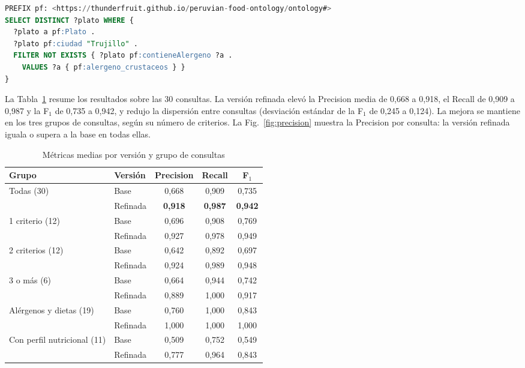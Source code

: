 \documentclass[conference]{IEEEtran}
\begin{document}
\begin{lstlisting}[language=SQL]
PREFIX pf: <https://thunderfruit.github.io/peruvian-food-ontology/ontology#>
SELECT DISTINCT ?plato WHERE {
  ?plato a pf:Plato .
  ?plato pf:ciudad "Trujillo" .
  FILTER NOT EXISTS { ?plato pf:contieneAlergeno ?a .
    VALUES ?a { pf:alergeno_crustaceos } }
}
\end{lstlisting}

La Tabla~\ref{tab:results} resume los resultados sobre las 30 consultas. La versión refinada elevó la Precision media de 0,668 a 0,918, el Recall de 0,909 a 0,987 y la F$_1$ de 0,735 a 0,942, y redujo la dispersión entre consultas (desviación estándar de la F$_1$ de 0,245 a 0,124). La mejora se mantiene en los tres grupos de consultas, según su número de criterios. La Fig.~\ref{fig:precision} muestra la Precision por consulta: la versión refinada iguala o supera a la base en todas ellas.

\begin{table}[t]
\centering
\caption{Métricas medias por versión y grupo de consultas}
\label{tab:results}
\begin{tabular}{llccc}
\toprule
Grupo & Versión & Precision & Recall & F$_1$ \\
\midrule
\multirow{2}{*}{Todas (30)} & Base & 0,668 & 0,909 & 0,735 \\
 & Refinada & \textbf{0,918} & \textbf{0,987} & \textbf{0,942} \\
\midrule
\multirow{2}{*}{1 criterio (12)} & Base & 0,696 & 0,908 & 0,769 \\
 & Refinada & 0,927 & 0,978 & 0,949 \\
\multirow{2}{*}{2 criterios (12)} & Base & 0,642 & 0,892 & 0,697 \\
 & Refinada & 0,924 & 0,989 & 0,948 \\
\multirow{2}{*}{3 o más (6)} & Base & 0,664 & 0,944 & 0,742 \\
 & Refinada & 0,889 & 1,000 & 0,917 \\
\midrule
\multirow{2}{*}{Alérgenos y dietas (19)} & Base & 0,760 & 1,000 & 0,843 \\
 & Refinada & 1,000 & 1,000 & 1,000 \\
\multirow{2}{*}{Con perfil nutricional (11)} & Base & 0,509 & 0,752 & 0,549 \\
 & Refinada & 0,777 & 0,964 & 0,843 \\
\bottomrule
\end{tabular}
\end{table}
\end{document}
